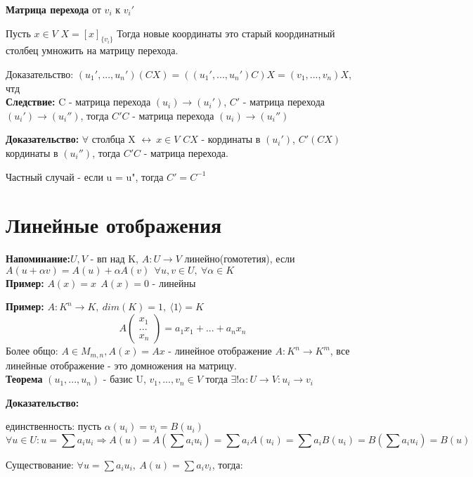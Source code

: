 \documentclass[12pt]{article}
\begin{document}
  \textbf{Матрица перехода} от $v_i$ к $v_i'$

  Пусть $x \in V$ $X = [x]_{\{v_i\}}$ Тогда новые координаты это старый координатный столбец умножить на матрицу перехода. 

  Доказательство: $(u_1', ..., u_n')(CX) = ((u_1', ..., u_n')C)X = (v_1, ..., v_n)X$, чтд
  \\

 \textbf{Следствие:} C - матрица перехода $(u_i) \rightarrow (u_i')$, $C'$ - матрица перехода $(u_i') \rightarrow (u_i'')$, тогда $C'C$ - матрица перехода $(u_i) \rightarrow (u_i'')$

 \textbf{Доказательство:} $\forall$ столбца X $\leftrightarrow \ x \in V$ $CX$ - кординаты в $(u_i')$, $C'(CX)$ кординаты в $(u_i'')$, тогда $C'C$ - матрица перехода.

 Частный случай - если u = u", тогда $C'  = C^{-1}$



 \section{Линейные отображения}

 \textbf{Напоминание:}$ U, V$ - вп над K, $A : U \rightarrow V$ линейно(гомотетия), если $A(u + \alpha v) = A(u) + \alpha A(v) \ \ \forall u, v \in U, \ \forall \alpha \in K$
\\

 \textbf{Пример:} $A(x) = x \ \ A(x) = 0$ - линейны

 \textbf{Пример:} $A: K^n \rightarrow K, \ dim(K) = 1, \ \langle1\rangle = K$ $$A\begin{pmatrix}
     x_1 \\
     ... \\
     x_n
 \end{pmatrix} = a_1x_1 + ... + a_nx_n$$
 Более общо: $A \in M_{m, n}, A(x) = Ax$ - линейное отображение $A: K^n \rightarrow K^m$, все линейные отображение - это домножения на матрицу.
 \\

 \textbf{Теорема} $(u_1, ..., u_n)$ - базис U, $v_1, ..., v_n \in V$ тогда $\exists ! \alpha: U \rightarrow V: u_i \rightarrow v_i$

  \textbf{Доказательство:}
  
  единственность: пусть $\alpha(u_i) = v_i = B(u_i)$ $$\forall u\in U: u=\sum a_iu_i\Rightarrow A(u)=A(\sum a_iu_i)=\sum a_iA(u_i)=\sum a_iB(u_i)=B(\sum a_iu_i)=B(u)$$
  
  Существование: $\forall u = \sum a_i u_i, \ A(u) = \sum a_i v_i$, тогда:
  
\end{document}
